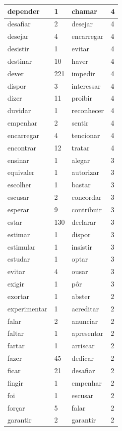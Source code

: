 \documentclass[output=paper,colorlinks,citecolor=brown]{langscibook}
\begin{document}
\begin{longtable}{ p{3cm} | p{1cm} | p{3cm} | p{1cm} }
		depender & 1 & chamar & 4\\\hline
		desafiar & 2 & desejar & 4\\\hline
		desejar & 4 & encarregar & 4\\\hline
		desistir & 1 & evitar & 4\\\hline
		destinar & 10 & haver & 4\\\hline
		dever & 221 & impedir & 4\\\hline
		dispor & 3 & interessar & 4\\\hline
		dizer & 11 & proibir & 4\\\hline
		duvidar & 1 & reconhecer & 4\\\hline
		empenhar & 2 & sentir & 4\\\hline
		encarregar & 4 & tencionar & 4\\\hline
		encontrar & 12 & tratar & 4\\\hline
		ensinar & 1 & alegar & 3\\\hline
		equivaler & 1 & autorizar & 3\\\hline
		escolher & 1 & bastar & 3\\\hline
		escusar & 2 & concordar & 3\\\hline
		esperar & 9 & contribuir & 3\\\hline
		estar & 130 & declarar & 3\\\hline
		estimar & 1 & dispor & 3\\\hline
		estimular & 1 & insistir & 3\\\hline
		estudar & 1 & optar & 3\\\hline
		evitar & 4 & ousar & 3\\\hline
		exigir & 1 & pôr & 3\\\hline
		exortar & 1 & abster & 2\\\hline
		experimentar & 1 & acreditar & 2\\\hline
		falar & 2 & anunciar & 2\\\hline
		faltar & 1 & apresentar & 2\\\hline
		fartar & 1 & arriscar & 2\\\hline
		fazer & 45 & dedicar & 2\\\hline
		ficar & 21 & desafiar & 2\\\hline
		fingir & 1 & empenhar & 2\\\hline
		foi & 1 & escusar & 2\\\hline
		forçar & 5 & falar & 2\\\hline
		garantir & 2 & garantir & 2\\\hline

\end{longtable}
\end{document}
